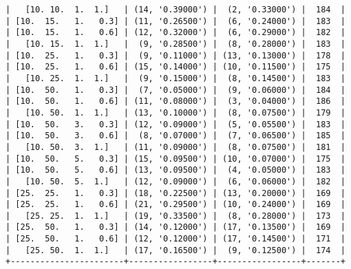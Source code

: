 \documentclass{article}
\begin{document}
\begin{verbatim}
|   [10. 10.  1.  1.]   | (14, '0.39000') |  (2, '0.33000') |  184  |
| [10.  15.   1.   0.3] | (11, '0.26500') |  (6, '0.24000') |  183  |
| [10.  15.   1.   0.6] | (12, '0.32000') |  (6, '0.29000') |  182  |
|   [10. 15.  1.  1.]   |  (9, '0.28500') |  (8, '0.28000') |  183  |
| [10.  25.   1.   0.3] |  (9, '0.11000') | (13, '0.13000') |  178  |
| [10.  25.   1.   0.6] | (15, '0.14000') | (10, '0.11500') |  175  |
|   [10. 25.  1.  1.]   |  (9, '0.15000') |  (8, '0.14500') |  183  |
| [10.  50.   1.   0.3] |  (7, '0.05000') |  (9, '0.06000') |  184  |
| [10.  50.   1.   0.6] | (11, '0.08000') |  (3, '0.04000') |  186  |
|   [10. 50.  1.  1.]   | (13, '0.10000') |  (8, '0.07500') |  179  |
| [10.  50.   3.   0.3] | (12, '0.09000') |  (5, '0.05500') |  183  |
| [10.  50.   3.   0.6] |  (8, '0.07000') |  (7, '0.06500') |  185  |
|   [10. 50.  3.  1.]   | (11, '0.09000') |  (8, '0.07500') |  181  |
| [10.  50.   5.   0.3] | (15, '0.09500') | (10, '0.07000') |  175  |
| [10.  50.   5.   0.6] | (13, '0.09500') |  (4, '0.05000') |  183  |
|   [10. 50.  5.  1.]   | (12, '0.09000') |  (6, '0.06000') |  182  |
| [25.  25.   1.   0.3] | (18, '0.22500') | (13, '0.20000') |  169  |
| [25.  25.   1.   0.6] | (21, '0.29500') | (10, '0.24000') |  169  |
|   [25. 25.  1.  1.]   | (19, '0.33500') |  (8, '0.28000') |  173  |
| [25.  50.   1.   0.3] | (14, '0.12000') | (17, '0.13500') |  169  |
| [25.  50.   1.   0.6] | (12, '0.12000') | (17, '0.14500') |  171  |
|   [25. 50.  1.  1.]   | (17, '0.16500') |  (9, '0.12500') |  174  |
+-----------------------+-----------------+-----------------+-------+
\end{verbatim}
\end{document}
